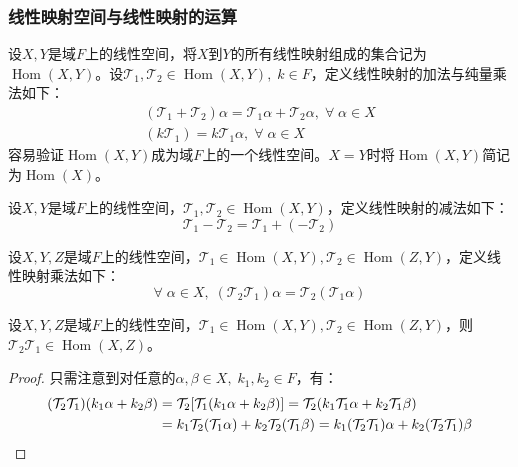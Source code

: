 \subsubsection{线性映射空间与线性映射的运算}
\begin{definition}
	设$X,Y$是域$F$上的线性空间，将$X$到$Y$的所有线性映射组成的集合记为$\operatorname{Hom}(X,Y)$。设$\mathcal{T}_1,\mathcal{T}_2\in\operatorname{Hom}(X,Y),\;k\in F$，定义线性映射的加法与纯量乘法如下：
	\begin{gather*}
		(\mathcal{T}_1+\mathcal{T}_2)\alpha=\mathcal{T}_1\alpha+\mathcal{T}_2\alpha,\;\forall\;\alpha\in X \\
		(k\mathcal{T}_1)=k\mathcal{T}_1\alpha,\;\forall\;\alpha\in X
	\end{gather*}
	容易验证$\operatorname{Hom}(X,Y)$成为域$F$上的一个线性空间。$X=Y$时将$\operatorname{Hom}(X,Y)$简记为$\operatorname{Hom}(X)$。
\end{definition}
\begin{definition}
	设$X,Y$是域$F$上的线性空间，$\mathcal{T}_1,\mathcal{T}_2\in\operatorname{Hom}(X,Y)$，定义线性映射的减法如下：
	\begin{equation*}
		\mathcal{T}_1-\mathcal{T}_2=\mathcal{T}_1+(-\mathcal{T}_2)
	\end{equation*}
\end{definition}
\begin{definition}
	设$X,Y,Z$是域$F$上的线性空间，$\mathcal{T}_1\in\operatorname{Hom}(X,Y),\mathcal{T}_2\in\operatorname{Hom}(Z,Y)$，定义线性映射乘法如下：
	\begin{equation*}
		\forall\;\alpha\in X,\;(\mathcal{T}_2\mathcal{T}_1)\alpha=\mathcal{T}_2(\mathcal{T}_1\alpha)
	\end{equation*}
\end{definition}
\begin{theorem}
	设$X,Y,Z$是域$F$上的线性空间，$\mathcal{T}_1\in\operatorname{Hom}(X,Y),\mathcal{T}_2\in\operatorname{Hom}(Z,Y)$，则$\mathcal{T}_2\mathcal{T}_1\in\operatorname{Hom}(X,Z)$。
\end{theorem}
\begin{proof}
	只需注意到对任意的$\alpha,\beta\in X,\;k_1,k_2\in F$，有：
	\begin{align*}
		(\mathcal{T}_2\mathcal{T}_1)(k_1\alpha+k_2\beta)
		&=\mathcal{T}_2[\mathcal{T}_1(k_1\alpha+k_2\beta)]
		=\mathcal{T}_2(k_1\mathcal{T}_1\alpha+k_2\mathcal{T}_1\beta) \\
		&=k_1\mathcal{T}_2(\mathcal{T}_1\alpha)+k_2\mathcal{T}_2(\mathcal{T}_1\beta)
		=k_1(\mathcal{T}_2\mathcal{T}_1)\alpha+k_2(\mathcal{T}_2\mathcal{T}_1)\beta\qedhere
	\end{align*}
\end{proof}
